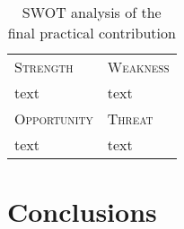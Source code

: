 \documentclass[12pt,a4paper,draft]{report}
\begin{document}
\begin{table}[h]
    \centering
    \begin{tabular}{p{}|p{}}
        \toprule
        \textsc{Strength} & \textsc{Weakness} \\
        text & text \\\midrule
        \textsc{Opportunity} & \textsc{Threat} \\
        text & text \\\bottomrule
    \end{tabular}
    \caption{SWOT analysis of the final practical contribution}
    \label{tab:my_label}
\end{table}


\section{Conclusions}





\end{document}
